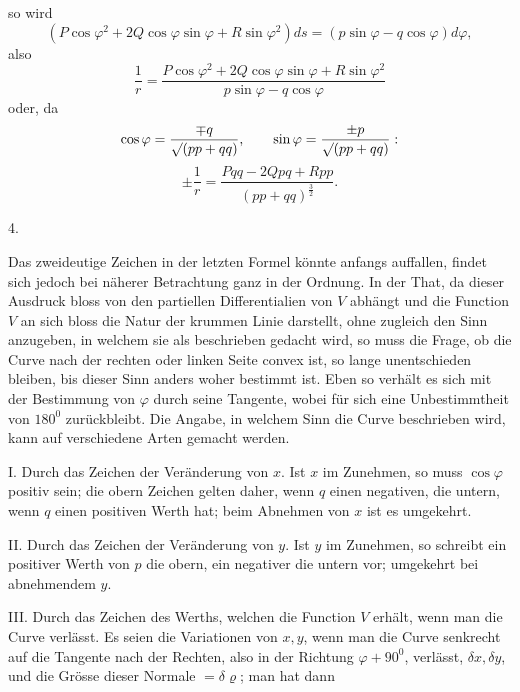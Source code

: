 %
\noindent so wird
\[
(P\cos\varphi^2+2Q\cos\varphi\sin\varphi+R\sin\varphi^2)ds=(p\sin\varphi-q\cos\varphi)d\varphi,
\]
also
\[
\frac1r=\frac{P\cos\varphi^2+2Q\cos\varphi\sin\varphi+R\sin\varphi^2}{p\sin\varphi-q\cos\varphi}
\]
oder, da
\[
\cos\varphi=\frac{\mp q}{\mathord{\surd}(pp+qq)},\qquad\sin\varphi=\frac{\pm p}{\mathord{\surd}(pp+qq)}:
\]
\[
\pm\frac1r=\frac{Pqq-2Qpq+Rpp}{(pp+qq)^{\frac32}}.
\]

\begin{center}4.\end{center}
\noindent\hspace*{1.2em}Das zweideutige Zeichen in der letzten Formel könnte anfangs auffallen, findet sich jedoch bei näherer Betrachtung ganz in der Ordnung. In der That, da dieser Ausdruck bloss von den partiellen Differentialien von $V$ abhängt und die Function $V$ an sich bloss die Natur der krummen Linie darstellt, ohne zugleich den Sinn anzugeben, in welchem sie als beschrieben gedacht wird, so muss die Frage, ob die Curve nach der rechten oder linken Seite convex ist, so lange unentschieden bleiben, bis dieser Sinn anders woher bestimmt ist. Eben so verhält es sich mit der Bestimmung von $\varphi$ durch seine Tangente, wobei für sich eine Unbestimmtheit von $180^{0}$ zurückbleibt. Die Angabe, in welchem Sinn die Curve beschrieben wird, kann auf verschiedene Arten gemacht werden.

I. Durch das Zeichen der Veränderung von $x$. Ist $x$ im Zunehmen, so muss $\cos\varphi$ positiv sein; die obern Zeichen gelten daher, wenn $q$ einen negativen, die untern, wenn $q$ einen positiven Werth hat; beim Abnehmen von $x$ ist es umgekehrt.

II. Durch das Zeichen der Veränderung von $y$. Ist $y$ im Zunehmen, so schreibt ein positiver Werth von $p$ die obern, ein negativer die untern vor; umgekehrt bei abnehmendem $y$.

III. Durch das Zeichen des Werths, welchen die Function $V$ erhält, wenn man die Curve verlässt. Es seien die Variationen von $x,y$, wenn man die Curve senkrecht auf die Tangente nach der Rechten, also in der Richtung $\varphi+90^{0}$, verlässt, $\delta x,\delta y$, und die Grösse dieser Normale $=\delta\varrho$; man hat dann
